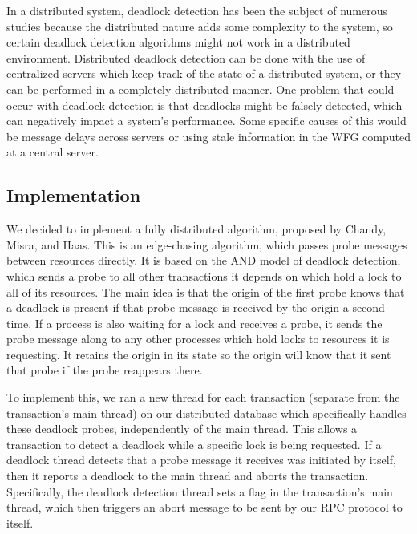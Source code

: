 \documentclass[a4paper, 10pt, notitlepage]{article}
\begin{document}
In a distributed system, deadlock detection has been the subject of numerous studies because the distributed nature adds some complexity to the system, so certain deadlock detection algorithms might not work in a distributed environment. Distributed deadlock detection can be done with the use of centralized servers which keep track of the state of a distributed system, or they can be performed in a completely distributed manner. One problem that could occur with deadlock detection is that deadlocks might be falsely detected, which can negatively impact a system's performance. Some specific causes of this would be message delays across servers or using stale information in the WFG computed at a central server.

\subsection{Implementation}
We decided to implement a fully distributed algorithm, proposed by Chandy, Misra, and Haas. This is an edge-chasing algorithm, which passes probe messages between resources directly. It is based on the AND model of deadlock detection, which sends a probe to all other transactions it depends on which hold a lock to all of its resources. The main idea is that the origin of the first probe knows that a deadlock is present if that probe message is received by the origin a second time. If a process is also waiting for a lock and receives a probe, it sends the probe message along to any other processes which hold locks to resources it is requesting. It retains the origin in its state so the origin will know that it sent that probe if the probe reappears there.

To implement this, we ran a new thread for each transaction (separate from the transaction's main thread) on our distributed database which specifically handles these deadlock probes, independently of the main thread. This allows a transaction to detect a deadlock while a specific lock is being requested. If a deadlock thread detects that a probe message it receives was initiated by itself, then it reports a deadlock to the main thread and aborts the transaction. Specifically, the deadlock detection thread sets a flag in the transaction's main thread, which then triggers an abort message to be sent by our RPC protocol to itself.
\end{document}
